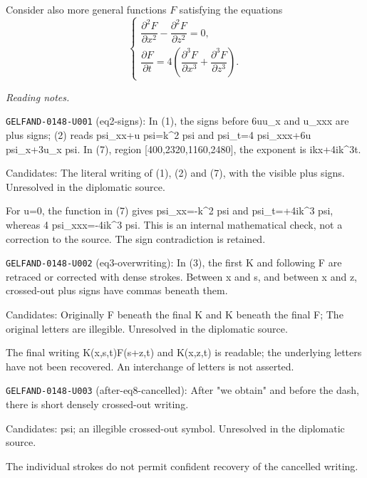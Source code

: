 Consider also more general functions $F$ satisfying the equations
\begin{equation*}
\begin{cases}
\dfrac{\partial^2F}{\partial x^2}-\dfrac{\partial^2F}{\partial z^2}=0,\\[6pt]
\dfrac{\partial F}{\partial t}=4\left(\dfrac{\partial^3F}{\partial x^3}+\dfrac{\partial^3F}{\partial z^3}\right).
\end{cases} \tag{9}
\end{equation*}


\par\smallskip\noindent\textit{Reading notes.}\par
\noindent\texttt{GELFAND-0148-U001} (eq2-signs): In (1), the signs before 6uu\_x and u\_xxx are plus signs; (2) reads psi\_xx+u psi=k\textasciicircum{}2 psi and psi\_t=4 psi\_xxx+6u psi\_x+3u\_x psi. In (7), region [400,2320,1160,2480], the exponent is ikx+4ik\textasciicircum{}3t.\par
Candidates: The literal writing of (1), (2) and (7), with the visible plus signs. Unresolved in the diplomatic source.\par
For u=0, the function in (7) gives psi\_xx=-k\textasciicircum{}2 psi and psi\_t=+4ik\textasciicircum{}3 psi, whereas 4 psi\_xxx=-4ik\textasciicircum{}3 psi. This is an internal mathematical check, not a correction to the source. The sign contradiction is retained. \par
\noindent\texttt{GELFAND-0148-U002} (eq3-overwriting): In (3), the first K and following F are retraced or corrected with dense strokes. Between x and s, and between x and z, crossed-out plus signs have commas beneath them.\par
Candidates: Originally F beneath the final K and K beneath the final F; The original letters are illegible. Unresolved in the diplomatic source.\par
The final writing K(x,s,t)F(s+z,t) and K(x,z,t) is readable; the underlying letters have not been recovered. An interchange of letters is not asserted.\par
\noindent\texttt{GELFAND-0148-U003} (after-eq8-cancelled): After "we obtain" and before the dash, there is short densely crossed-out writing.\par
Candidates: psi; an illegible crossed-out symbol. Unresolved in the diplomatic source.\par
The individual strokes do not permit confident recovery of the cancelled writing.\par


